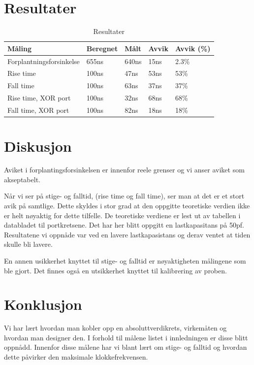 \documentclass{article}
\begin{document}
\section{Resultater}
\begin{table}[H]
	\centering
	\caption{Resultater}
	\label{my-label}
	\vspace{0.2cm}
	\begin{tabular}{| l | l | l | l | l |} \hline
	Måling & Beregnet & Målt & Avvik & Avvik (\%) \\ \hline
	Forplantningsforsinkelse & 655ns                  & 640ns         & 15ns         & 2.3\%             \\ \hline
	Rise time                & 100ns                  & 47ns          & 53ns         & 53\%              \\ \hline
	Fall time                & 100ns                  & 63ns          & 37ns         & 37\%              \\ \hline
	Rise time, XOR port      & 100ns                  & 32ns          & 68ns         & 68\%              \\ \hline
	Fall time, XOR port      & 100ns                  & 82ns          & 18ns         & 18\%		     	 \\ \hline
	\end{tabular}
\end{table}

\section{Diskusjon}
Aviket i forplantingsforsinkelsen er innenfor reele grenser og vi anser aviket som akseptabelt.



Når vi ser på stige- og falltid, (rise time og fall time), ser man at det er et stort avik på samtlige. Dette skyldes i stor grad at den oppgitte teoretiske verdien ikke er helt nøyaktig for dette tilfelle. De teoretiske verdiene er lest ut av tabellen i databladet til portkretsene. Det har her blitt oppgitt en lastkapasitans på 50pf. Resultatene vi oppnåde var ved en lavere lastkapasistans og derav ventet at tiden skulle bli lavere.

En annen usikkerhet knyttet til stige- og falltid er nøyaktigheten målingene som ble gjort. Det finnes også en utsikkerhet knyttet til kalibrering av proben.

\section{Konklusjon}
Vi har lært hvordan man kobler opp en absoluttverdikrets, virkemåten og hvordan man designer den. I forhold til målene listet i innledningen er disse blitt oppnådd. Innenfor disse målene har vi blant lært om stige- og falltid og hvordan dette påvirker den maksimale klokkefrekvensen.
\end{document}
